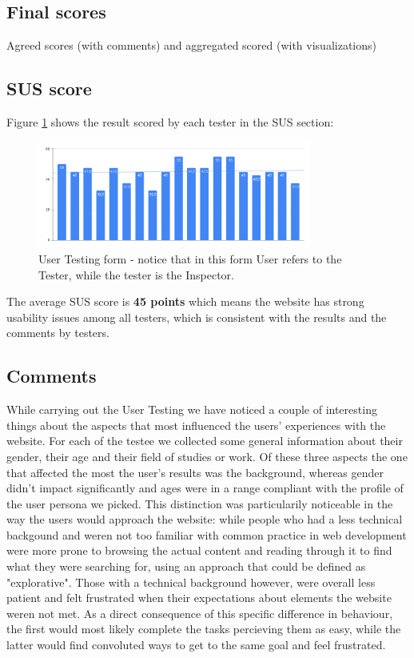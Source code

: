 \subsection{Final scores}
Agreed scores (with comments) and aggregated scored (with visualizations)

\subsection{SUS score}
Figure \ref{fig:sus_result} shows the result scored by each tester in the SUS section:
\begin{figure}[h]
	\centering
	\includegraphics[width=0.8\textwidth]{img/SUS.png}
	\caption{User Testing form - notice that in this form User refers to the Tester, while the tester is the Inspector.}
	\label{fig:sus_result}
\end{figure}
The average SUS score is \textbf{45 points} which means the website has strong usability issues among all testers, which is consistent with the results and the comments by testers.

\subsection{Comments}
While carrying out the User Testing we have noticed a couple of interesting things about the aspects that most influenced the users' experiences with the website. For each of the testee we collected some general information 
about their gender, their age and their field of studies or work. Of these three aspects the one that affected the most the user's results was the background, whereas gender didn't impact significantly and ages were in a range compliant with the profile of the user persona we picked. 
This distinction was particularily noticeable in the way the users would approach the website: while people who had a less technical backgound and weren not too familiar with common practice in web development were more prone to browsing the actual content and reading through it to 
find what they were searching for, using an approach that could be defined as "explorative". Those with a technical background however, were overall less patient and felt frustrated when their expectations about elements the website weren not met.
As a direct consequence of this specific difference in behaviour, the first would most likely complete the tasks percieving them as easy, while the latter would find convoluted ways to get to the same goal and feel frustrated.

